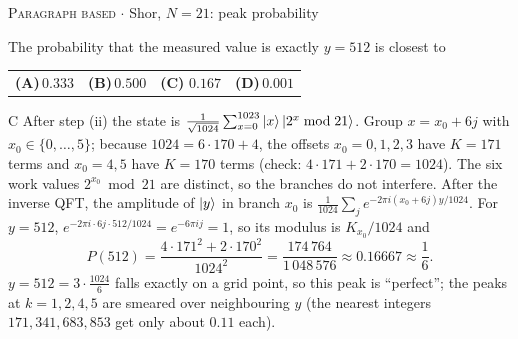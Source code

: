 \documentclass[11pt,a4paper]{article}
\newcommand{\optlabel}[1]{\textbf{(#1)}}
\newcommand{\correctlabel}[1]{\textcolor{okgreen}{\textbf{(#1)}\,\ding{51}}}
\newenvironment{qitem}[1]{\begin{list}{}{\setlength{\leftmargin}{3.3em}\setlength{\labelwidth}{3.1em}%
  \setlength{\labelsep}{0.2em}\setlength{\topsep}{3pt}\setlength{\parsep}{3pt}}\item[\textbf{Q.#1}\hfill]}{\end{list}}
\newcommand{\qsep}{\par\vspace{2pt}{\color{black!15}\hrule}\vspace{4pt}}
\newcommand{\qmeta}[2]{{\footnotesize\color{black!60}\textsc{#1} \;$\cdot$\; #2}\par}
\begin{document}
\begin{qitem}{80}
\qmeta{Paragraph based}{Shor, $N = 21$: peak probability}
The probability that the measured value is exactly $y = 512$ is closest to
\par\smallskip\noindent\begin{tabularx}{\linewidth}{@{}*{4}{L}@{}}
\optlabel{A}\,$0.333$ & \optlabel{B}\,$0.500$ & \correctlabel{C}\,$0.167$ & \optlabel{D}\,$0.001$
\end{tabularx}
\end{qitem}
\begin{solbox}{C}
After step (ii) the state is $\frac{1}{\sqrt{1024}}\sum_{x=0}^{1023}\ket{x}\ket{2^x \bmod 21}$. Group $x = x_0 + 6j$ with $x_0 \in \{0, \dots, 5\}$;
because $1024 = 6\cdot170 + 4$, the offsets $x_0 = 0,1,2,3$ have $K = 171$ terms and $x_0 = 4,5$ have $K = 170$ terms
(check: $4\cdot171 + 2\cdot170 = 1024$). The six work values $2^{x_0} \bmod 21$ are distinct, so the branches do not interfere. After
the inverse QFT, the amplitude of $\ket{y}$ in branch $x_0$ is $\frac{1}{1024}\sum_{j}e^{-2\pi i(x_0 + 6j)y/1024}$. For $y = 512$,
$e^{-2\pi i\cdot6j\cdot512/1024} = e^{-6\pi i j} = 1$, so its modulus is $K_{x_0}/1024$ and
\[ P(512) = \frac{4\cdot171^2 + 2\cdot170^2}{1024^2} = \frac{174\,764}{1\,048\,576} \approx 0.16667 \approx \frac16 . \]
$y = 512 = 3\cdot\frac{1024}{6}$ falls exactly on a grid point, so this peak is ``perfect''; the peaks at $k = 1, 2, 4, 5$ are smeared
over neighbouring $y$ (the nearest integers $171, 341, 683, 853$ get only about $0.11$ each).
\end{solbox}
\qsep
\end{document}
